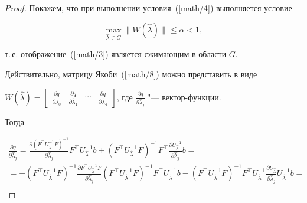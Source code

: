 \begin{proof}






    Покажем,  что при выполнении условия~(\ref{math/4})  выполняется условие

$$\max_{\hat{\lambda}\in     G} \bigl\|W( \hat{\lambda} ) \bigr\|\leq\alpha<1, $$

    т.\,е. отображение~(\ref{math/3}) является сжимающим в области  $G$. 

    Действительно,  матрицу Якоби~(\ref{math/8}) можно представить в виде

    $W( \hat{\lambda} ) =\left[

                        \begin{array}{cccc}

                            \frac{\partial q}{\partial\hat{\lambda}_0}& \frac{\partial q}{\partial\hat{\lambda}_1} & \cdots & \frac{\partial q}{\partial\hat{\lambda}_4}

                        \end{array}

                    \right]$,  где  $ \frac{\partial q}{\partial\hat{\lambda}_j}$ "--- вектор-функции. 

Тогда {\small

\begin{multline*} 

\frac{\partial q}{\partial\hat{\lambda}_j}=\frac{\partial ( F^{\top}U^{-1}_{\hat{\lambda}}F ) ^{-1}}{\partial\hat{\lambda}_j}F^{\top}U^{-1}_{\hat{\lambda}}b+( F^{\top}U^{-1}_{\hat{\lambda}}F ) ^{-1}F^{\top}\frac{\partial U^{-1}_{\hat{\lambda}}}{\partial\hat{\lambda}_j}b= \\

=

        -( F^{\top}U^{-1}_{\hat{\lambda}}F ) ^{-1}\frac{\partial F^{\top}U^{-1}_{\hat{\lambda}}F}{\partial\hat{\lambda}_j}( F^{\top}U^{-1}_{\hat{\lambda}}F ) ^{-1}F^{\top}U^{-1}_{\hat{\lambda}}b-( F^{\top}U^{-1}_{\hat{\lambda}}F ) ^{-1}F^{\top}U^{-1}_{\hat{\lambda}}\frac{\partial U_{\hat{\lambda}}}{\partial\hat{\lambda}_j}U^{-1}_{\hat{\lambda}}b=\\


\end{multline*}}
\end{proof}
